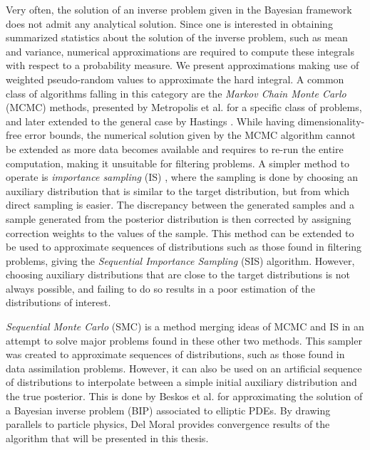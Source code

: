 Very often, the solution of an inverse problem given in the Bayesian framework does not admit any analytical solution. Since one is interested in obtaining summarized statistics about the solution of the inverse problem, such as mean and variance, numerical approximations are required to compute these integrals with respect to a probability measure. We present approximations making use of weighted pseudo-random values to approximate the hard integral. A common class of algorithms falling in this category are the \textit{Markov Chain Monte Carlo} (MCMC) methods, presented by Metropolis et al. \cite{metropolis1953equation} for a specific class of problems, and later extended to the general case by Hastings \cite{hastings1970monte}. While having dimensionality-free error bounds, the numerical solution given by the MCMC algorithm cannot be extended as more data becomes available and requires to re-run the entire computation, making it unsuitable for filtering problems. A simpler method to operate is \textit{importance sampling} (IS) \cite{Robert}, where the sampling is done by choosing an auxiliary distribution that is similar to the target distribution, but from which direct sampling is easier. The discrepancy between the generated samples and a sample generated from the posterior distribution is then corrected by assigning correction weights to the values of the sample. This method can be extended to be used to approximate sequences of distributions such as those found in filtering problems, giving the \textit{Sequential Importance Sampling} (SIS) algorithm. However, choosing auxiliary distributions that are close to the target distributions is not always possible, and failing to do so results in a poor estimation of the distributions of interest.

\textit{Sequential Monte Carlo} (SMC) \cite{del_moral_2006} is a method merging ideas of MCMC and IS in an attempt to solve major problems found in these other two methods. This sampler was created to approximate sequences of distributions, such as those found in data assimilation problems. However, it can also be used on an artificial sequence of distributions to interpolate between a simple initial auxiliary distribution and the true posterior. This is done by Beskos et al. \cite{beskos2015sequential} for approximating the solution of a Bayesian inverse problem (BIP) associated to elliptic PDEs. By drawing parallels to particle physics, Del Moral \cite{del2013mean, del2004feynman} provides convergence results of the algorithm that will be presented in this thesis.

